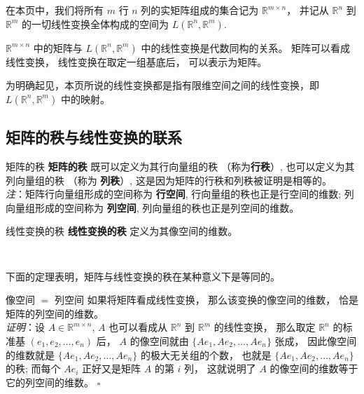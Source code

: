 

在本页中，我们将所有 $m$ 行 $n$ 列的实矩阵组成的集合记为 $\mathbb{R}^{m\times n}$， 并记从 $\mathbb{R}^{n}$ 到 $\mathbb{R}^{m}$ 的一切线性变换全体构成的空间为 $L(\mathbb{R}^{n},\mathbb{R}^{m}).$

$\mathbb{R}^{m\times n}$ 中的矩阵与 $L(\mathbb{R}^{n},\mathbb{R}^{m})$
中的线性变换是代数同构的关系。 矩阵可以看成线性变换， 线性变换在取定一组基底后， 可以表示为矩阵。 

为明确起见，本页所说的线性变换都是指有限维空间之间的线性变换，即 $L(\mathbb{R}^{n},\mathbb{R}^{m})$ 中的映射。

\subsection{矩阵的秩与线性变换的联系}

\begin{definition}{矩阵的秩}\label{def_linmat_2}
\textbf{矩阵的秩} 既可以定义为其行向量组的秩 （称为\textbf{行秩}）, 也可以定义为其列向量组的秩 （称为 \textbf{列秩}）,
这是因为矩阵的行秩和列秩被证明是相等的。 \\

\textsl{注}：矩阵行向量组形成的空间称为 \textbf{行空间}, 行向量组的秩也正是行空间的维数;
列向量组形成的空间称为 \textbf{列空间}, 列向量组的秩也正是列空间的维数。
\end{definition}



\begin{definition}{线性变换的秩}
\textbf{线性变换的秩} 定义为其像空间的维数。
\end{definition} 
\verb| |

下面的定理表明，矩阵与线性变换的秩在某种意义下是等同的。
\begin{theorem}{像空间 $=$ 列空间}\label{the_linmat_1}
 如果将矩阵看成线性变换， 那么该变换的像空间的维数， 恰是矩阵的列空间的维数。\\

\textsl{ 证明}：设 $A\in\mathbb{R}^{m\times n}$, $A$ 也可以看成从 $\mathbb{R}^{n}$ 到 $\mathbb{R}^{m}$
的线性变换， 那么取定 $\mathbb{R}^{n}$ 的标准基 $(e_{1},e_{2},\ldots,e_{n})$ 后，
$A$ 的像空间就由 $\{Ae_{1},Ae_{2},\ldots,Ae_{n}\}$ 张成， 因此像空间的维数就是 $\{Ae_{1},Ae_{2},\ldots,Ae_{n}\}$
的极大无关组的个数， 也就是 $\{Ae_{1},Ae_{2},\ldots,Ae_{n}\}$ 的秩; 而每个 $Ae_{i}$
正好又是矩阵 $A$ 的第 $i$ 列， 这就说明了 $A$ 的像空间的维数等于它的列空间的维数。 $\square$
\end{theorem}

